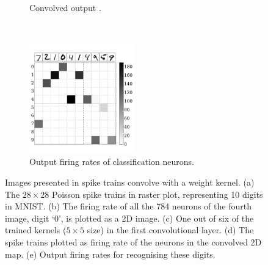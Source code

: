 \begin{figure}[htbp!]
\begin{subfigure}[t]{0.3\textwidth}
			\caption{Convolved output \DIFaddbeginFL {}\DIFaddendFL .}
			\label{Fig:64}
		\end{subfigure}\\
		\begin{subfigure}[t]{\textwidth}
			\centering
			\includegraphics[width=0.5\textwidth]{pics_iconip/7.pdf}
			\caption{Output firing rates of classification neurons.}
		\end{subfigure}
		\caption[Images presented in spike trains convolve with a weight kernel.]{Images presented in spike trains convolve with a weight kernel. (a) The $28\times28$ Poisson spike trains in raster plot, representing 10 digits in MNIST. (b) The firing rate of all the 784 neurons of the fourth image, digit `0', is plotted as a 2D image.
		(c) One out of six of the trained kernels ($5\times5$ size) in the first convolutional layer.
		(d) The spike trains plotted as firing rate of the neurons in the convolved 2D map.
		(e) Output firing rates for recognising these digits.}
		\label{fig:cnn}
	\end{figure}

